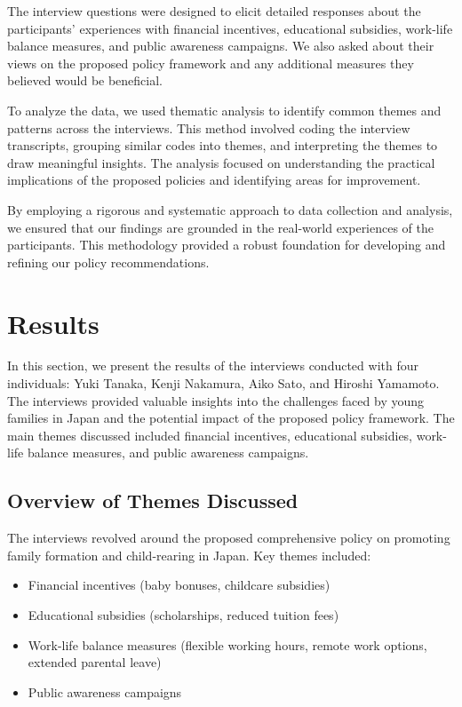 \documentclass{article} %
\begin{document}
The interview questions were designed to elicit detailed responses about the participants' experiences with financial incentives, educational subsidies, work-life balance measures, and public awareness campaigns. We also asked about their views on the proposed policy framework and any additional measures they believed would be beneficial.

To analyze the data, we used thematic analysis to identify common themes and patterns across the interviews. This method involved coding the interview transcripts, grouping similar codes into themes, and interpreting the themes to draw meaningful insights. The analysis focused on understanding the practical implications of the proposed policies and identifying areas for improvement.

By employing a rigorous and systematic approach to data collection and analysis, we ensured that our findings are grounded in the real-world experiences of the participants. This methodology provided a robust foundation for developing and refining our policy recommendations.


\section{Results}
\label{sec:results}

In this section, we present the results of the interviews conducted with four individuals: Yuki Tanaka, Kenji Nakamura, Aiko Sato, and Hiroshi Yamamoto. The interviews provided valuable insights into the challenges faced by young families in Japan and the potential impact of the proposed policy framework. The main themes discussed included financial incentives, educational subsidies, work-life balance measures, and public awareness campaigns.

\subsection{Overview of Themes Discussed}
The interviews revolved around the proposed comprehensive policy on promoting family formation and child-rearing in Japan. Key themes included:
\begin{itemize}
    \item Financial incentives (baby bonuses, childcare subsidies)
    \item Educational subsidies (scholarships, reduced tuition fees)
    \item Work-life balance measures (flexible working hours, remote work options, extended parental leave)
    \item Public awareness campaigns
\end{itemize}
\end{document}
